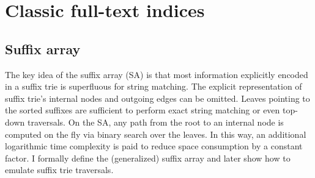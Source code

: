 \section{Classic full-text indices}

\subsection{Suffix array}
\label{sec:index:sa}

The key idea of the suffix array (SA) \citep{Manber1990} is that most information explicitly encoded in a suffix trie is superfluous for string matching.
The explicit representation of suffix trie's internal nodes and outgoing edges can be omitted.
Leaves pointing to the sorted suffixes are sufficient to perform exact string matching or even top-down traversals.
On the SA, any path from the root to an internal node is computed on the fly via binary search over the leaves.
In this way, an additional logarithmic time complexity is paid to reduce space consumption by a constant factor.
I formally define the (generalized) suffix array and later show how to emulate suffix trie traversals.



